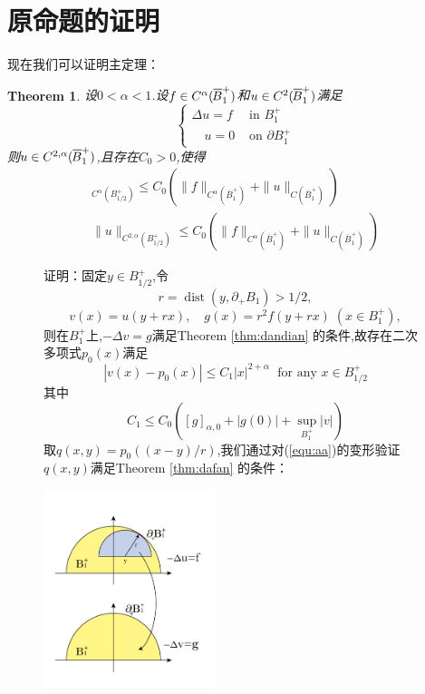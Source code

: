 \documentclass[12pt,A4paper,reqno]{amsart}
\numberwithin{equation}{section}
\theoremstyle{plain}
\newtheorem{theorem}{Theorem}[section]
\theoremstyle{plain}
\theoremstyle{plain}
\numberwithin{equation}{section}
\theoremstyle{remark}
\newcommand*{\norm}[1]{\lVert#1\rVert}
\newcommand*\widebar[1]{%
	\hbox{%
		\vbox{%
			\hrule height 0.5pt %
			\kern0.35ex%
			\hbox{%
				\kern -0.1em%
				\ensuremath{#1}%
				\kern 0em%
			}%
		}%
	}%
}
\begin{document}

\section{原命题的证明}
现在我们可以证明主定理：
\begin{theorem}
	设$0< \alpha <1$.设$f \in C^{\alpha}(\widebar{B}_{1}^{+})$和$u \in C^{2}(\widebar{B}_{1}^{+})$满足
	$$\begin{cases}
	\Delta u=f & \text{ in }B_{1}^{+}\\
	\phantom{12}u=0 &\text{ on }\partial B_{1}^{+} 
	\end{cases}$$
	则$u \in C^{2,\alpha}(\widebar{B}_{1}^{+})$,且存在$C_0 >0$,使得
	\begin{align}
	[D^{2} u]_{C^{\alpha}(B_{1/2}^{+})} \leqslant C_{0}(\|f\|_{C^{\alpha}(\overline{B}_{1}^{+})}+\|u\|_{C(\overline{B}_{1}^{+})})  \\
	\norm{u}_{C^{2,\alpha}(B_{1/2}^{+})} \leqslant C_{0}(\|f\|_{C^{\alpha}(\overline{B}_{1}^{+})}+\|u\|_{C(\overline{B}_{1}^{+})})
	\end{align}
	
\end{theorem}
		\begin{figure}[ht]
		\begin{minipage}[b]{.65\textwidth}
				证明：固定$y \in B_{1/2}^{+}$,令$$r=\operatorname{dist}\left(y, \partial_+ B_{1}\right)>1/2,$$$$v(x)=u(y+r x),\quad g(x)=r^{2} f(y+r x)\;(x \in B_1^{+}),$$则在$B_1^{+}$上,$-\Delta v=g$满足Theorem \ref{thm:dandian} 的条件,故存在二次多项式$p_0(x)$满足 
			\begin{equation}\label{equ:aa}
			|v(x)-p_0(x)| \leqslant C_1|x|^{2+\alpha}\;\text{ for any }x \in B_{1/2}^{+}
			\end{equation}
			其中
			$$C_1\leqslant C_{0}([g]_{\alpha, 0}+|g(0)|+\sup _{B_{1}^{+}} |v|)$$
			取$q(x,y)=p_0((x-y)/r)$,我们通过对(\ref{equ:aa})的变形验证$q(x,y)$满足Theorem \ref{thm:dafan} 的条件：
		\end{minipage}
		\begin{minipage}[b]{.33\textwidth}
			\centering
			\includegraphics[width=5cm]{figures/figure2-01.png}
			\caption{}
		\end{minipage}
	\end{figure}\vspace{-1cm}
\end{document}
